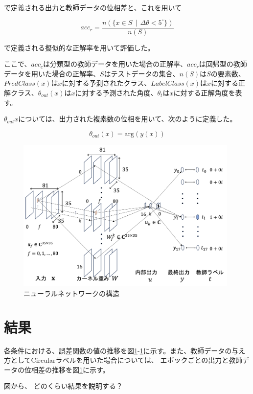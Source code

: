 \documentclass[11pt,a4paper,uplatex]{ujarticle}
\begin{document}
  で定義される出力と教師データの位相差と、これを用いて

  \begin{equation}
    acc_{r} = \frac{n(\{x \in S \, \mid\, \Delta\theta < 5^{\circ}\})}{n(S)}
  \end{equation} %

  で定義される擬似的な正解率を用いて評価した。

  ここで、$acc_c$は分類型の教師データを用いた場合の正解率、$acc_r$は回帰型の教師データを用いた場合の正解率、$S$はテストデータの集合、$n(S)$は$S$の要素数、
  $PredClass(x)$は$x$に対する予測されたクラス、$LabelClass(x)$は$x$に対する正解クラス、$\theta_{out}(x)$は$x$に対する予測された角度、$\theta_{t}$は$x$に対する正解角度を表す。

  $\theta_{out}{x}$については、出力された複素数の位相を用いて、次のように定義した。

  \begin{equation}
    \theta_{out}(x) = \mathrm{arg}(y(x))
  \end{equation} %

  \begin{figure}[hbtp]
    \centering
    \includegraphics[keepaspectratio, width=110mm]{Images/network.png}
    \caption{ニューラルネットワークの構造}
    \label{fig:neuralnet}
  \end{figure}
  

\section{結果}
  各条件における、誤差関数の値の推移を図\ref{}-\ref{}に示す。また、教師データの与え方としてCircularラベルを用いた場合については、
  エポックごとの出力と教師データの位相差の推移を図\ref{}に示す。

  図から、
  どのくらい結果を説明する？
\end{document}
